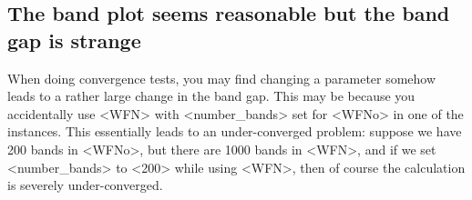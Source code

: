 \documentclass[hyperref, a4paper]{report}
\def\texttt#1{<#1>}%
\newcommand{\shortcode}[1]{\texttt{#1}}
\begin{document}
\subsection{The band plot seems reasonable but the band gap is strange}

When doing convergence tests, 
you may find changing a parameter 
somehow leads to a rather large change in the band gap. 
This may be because you accidentally use \shortcode{WFN} 
with \shortcode{number_bands} set for \shortcode{WFNo} 
in one of the instances. 
This essentially leads to an under-converged problem: 
suppose we have 200 bands in \shortcode{WFNo},
but there are 1000 bands in \shortcode{WFN}, 
and if we set \shortcode{number_bands} to \shortcode{200} 
while using \shortcode{WFN}, 
then of course the calculation is severely under-converged.



\end{document}
